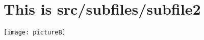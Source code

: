 \documentclass[../../main]{subfiles}
\begin{document}
\section*{This is src/subfiles/subfile2}
\texttt{[image: pictureB]}
\end{document}
